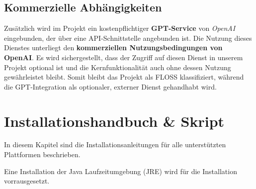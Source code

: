 \documentclass[a4paper,12pt]{report}
\begin{document}
    \subsection{Kommerzielle Abhängigkeiten}
    Zusätzlich wird im Projekt ein kostenpflichtiger \textbf{GPT-Service} von \textit{OpenAI} eingebunden, der über eine API-Schnittstelle angebunden ist.
    Die Nutzung dieses Dienstes unterliegt den \textbf{kommerziellen Nutzungsbedingungen von OpenAI}.
    Es wird sichergestellt, dass der Zugriff auf diesen Dienst in unserem Projekt optional ist und die Kernfunktionalität auch ohne dessen Nutzung gewährleistet bleibt.
    Somit bleibt das Projekt als FLOSS klassifiziert, während die GPT-Integration als optionaler, externer Dienst gehandhabt wird.

    \clearpage


    \section{Installationshandbuch \& Skript}
    In diesem Kapitel sind die Installationsanleitungen für alle unterstützten Plattformen beschrieben.

    Eine Installation der Java Laufzeitumgebung (JRE) wird für die Installation vorrausgesetzt.
\end{document}

